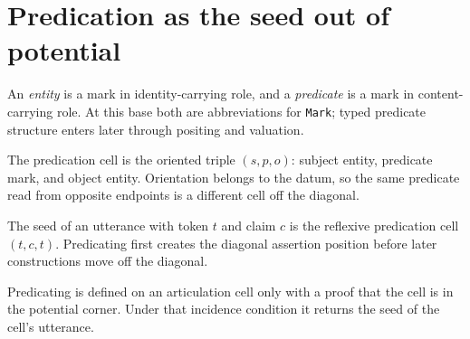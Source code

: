 \section{Predication as the seed out of potential}

\begin{proposition}\label{thm:entity-predicate}\leanok{}
An \emph{entity} is a mark in identity-carrying role, and a
\emph{predicate} is a mark in content-carrying role. At this base both are
abbreviations for \texttt{Mark}; typed predicate structure enters later
through positing and valuation.
\end{proposition}

\begin{proposition}\label{thm:predication}\leanok{}
The predication cell is the oriented triple $(s,p,o)$: subject entity,
predicate mark, and object entity. Orientation belongs to the datum, so the
same predicate read from opposite endpoints is a different cell off the
diagonal.
\end{proposition}

\begin{proposition}\label{thm:predication-seed}\leanok{}
The seed of an utterance with token $t$ and claim $c$ is the reflexive
predication cell $(t,c,t)$. Predicating first creates the diagonal assertion
position before later constructions move off the diagonal.
\end{proposition}

\begin{proposition}\label{thm:predicating-proper}\leanok{}
Predicating is defined on an articulation cell only with a proof that the
cell is in the potential corner. Under that incidence condition it returns
the seed of the cell's utterance.
\end{proposition}
